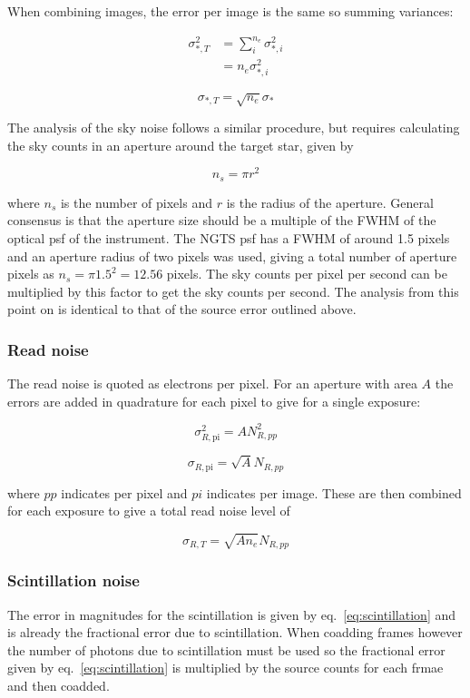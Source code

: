 \documentclass[11pt,a4paper]{report}
\begin{document}
When combining images, the error per image is the same so summing
variances:

\begin{align*}
    \sigma_{\ast,T}^2 &= \sum_i^{n_{e}} \sigma_{\ast,i}^2 \\
        & = n_{e} \sigma_{\ast,i}^2
\end{align*}

\[
    \sigma_{\ast, T} = \sqrt{n_{e}} \sigma_{\ast}
    \]

The analysis of the sky noise follows a similar procedure, but requires
calculating the sky counts in an aperture around the target star, given
by

\[
    n_{s} = \pi r^2
    \]

where $n_s$ is the number of pixels and $r$ is the radius of the
aperture. General consensus is that the aperture size should be a
multiple of the FWHM of the optical psf of the instrument. The NGTS psf
has a FWHM of around 1.5 pixels and an aperture radius of two pixels was
used, giving a total number of aperture pixels as $n_s = \pi 1.5^2 =
12.56$ pixels. The sky counts per pixel per second can be multiplied by
this factor to get the sky counts per second. The analysis from this
point on is identical to that of the source error outlined above.

\subsubsection{Read noise}

The read noise is quoted as electrons per pixel. For an aperture with
area $A$ the errors are added in quadrature for each pixel to give for a
single exposure:

\[
    \sigma_{R,\mathrm{pi}}^2 = A N_{R,pp}^2
    \]

\[
    \sigma_{R,\mathrm{pi}} = \sqrt{A} N_{R,pp}
\]

where $pp$ indicates per pixel and $pi$ indicates per image. These 
are then combined for each exposure to give a total read noise 
level of 

\[
    \sigma_{R,T} = \sqrt{A n_e} N_{R,pp}
    \]


\subsubsection{Scintillation noise}

The error in magnitudes for the scintillation is given by
eq.~\ref{eq:scintillation} and is already the fractional error due to
scintillation. When coadding frames however the number of photons due to
scintillation must be used so the fractional error given by
eq.~\ref{eq:scintillation} is multiplied by the source counts for each
frmae and then coadded.
\end{document}
